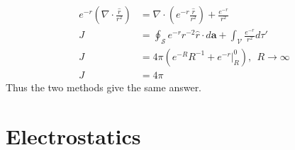 \documentclass[10pt]{article}
\begin{document}
\begin{enumerate}
\begin{itemize}
\begin{align}
e^{-r} \left( \nabla \cdot \frac{\hat{r}}{r^2} \right) &= \nabla \cdot \left(e^{-r} \frac{\hat{r}}{r^2}\right) + \frac{e^{-r}}{r^2} \\
J &= \oint_\mathcal{S} e^{-r} r^{-2} \hat{r} \cdot d\mathbf{a} + \int_\mathcal{V} \frac{e^{-r}}{r^2}d\tau' \\
J &= 4\pi \left(e^{-R} R^{-1} + \left.e^{-r}\right|_R^0 \right), ~~ R \to \infty \\
J &= 4\pi
\end{align}
Thus the two methods give the same answer.
\end{itemize}
\end{enumerate}

\clearpage

\section{Electrostatics}
\end{document}
